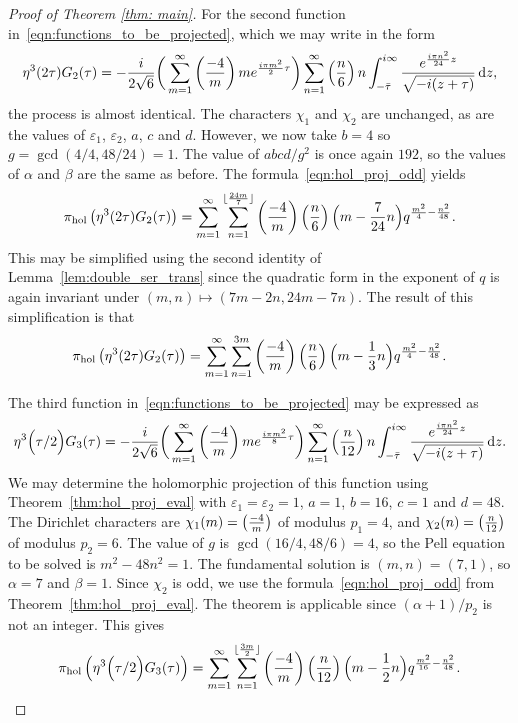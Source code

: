 \documentclass[11pt,reqno]{amsart}
\newcommand{\holoproj}[1]{\pi_{\mathrm{hol}}\left(#1\right)}
\renewcommand{\=}{\;=\;}
\theoremstyle{myremark}
\newcommand{\dd}{\mathrm{d}}
\begin{document}
\begin{proof}[Proof of Theorem \ref{thm: main}]
For the second function in~\eqref{eqn:functions_to_be_projected}, which we may write in the form
\[ \eta^3(2\tau) G_{2}(\tau) = -{i \over 2\sqrt{6}} \bigg( \sum_{m=1}^\infty \left({-4 \over m}\right) m e^{{i\pi m^2 \over 2}\tau} \bigg) \sum_{n=1}^\infty \left({n \over 6}\right) n \int_{-\bar{\tau}}^{i\infty} {e^{{i\pi n^2 \over 24}z} \over \sqrt{-i(z+\tau)}} \, \dd z, \]
the process is almost identical. The characters $\chi_1$ and $\chi_2$ are unchanged, as are the values of $\varepsilon_1$, $\varepsilon_2$, $a$, $c$ and $d$. However, we now take $b=4$ so $g=\gcd(4/4,48/24)=1$. The value of $abcd/g^2$ is once again $192$, so the values of $\alpha$ and $\beta$ are the same as before. The formula~\eqref{eqn:hol_proj_odd} yields
\[ 
\holoproj{\eta^3(2\tau) G_{2}(\tau)} = \sum_{m=1}^\infty \sum_{n=1}^{\lfloor {24m \over 7} \rfloor} \left({-4 \over m}\right) \left({n \over 6}\right) \Big(m - {7 \over 24}n \Big) q^{{m^2 \over 4} - {n^2 \over 48}}. 
\]
This may be simplified using the second identity of Lemma~\ref{lem:double_ser_trans} since the quadratic form in the exponent of $q$ is again invariant under $(m,n) \mapsto (7m-2n,24m-7n)$. The result of this simplification is that
\[ 
\holoproj{\eta^3(2\tau) G_{2}(\tau)} = \sum_{m=1}^\infty \sum_{n=1}^{3m} \left({-4 \over m}\right) \left({n \over 6}\right) \Big(m - {1 \over 3}n \Big) q^{{m^2 \over 4} - {n^2 \over 48}}. 
\]

The third function in~\eqref{eqn:functions_to_be_projected} may be expressed as
\[ 
\eta^3\Big({\tau / 2}\Big)G_{3}(\tau) = -{i \over 2\sqrt{6}} \bigg( \sum_{m=1}^\infty \left({-4 \over m}\right) m e^{{i\pi m^2 \over 8}\tau} \bigg) \sum_{n=1}^\infty \left({n \over 12}\right) n \int_{-\bar{\tau}}^{i\infty} {e^{{i\pi n^2 \over 24}z} \over \sqrt{-i(z+\tau)}} \, \dd z. 
\]
We may determine the holomorphic projection of this function using Theorem~\ref{thm:hol_proj_eval} with $\varepsilon_1=\varepsilon_2=1$, $a=1$, $b=16$, $c=1$ and $d=48$. The Dirichlet characters are $\chi_1(m)=\left({-4\over m}\right)$ of modulus $p_1=4$, and $\chi_2(n) = \left({n\over 12}\right)$ of modulus $p_2=6$. The value of $g$ is $\gcd(16/4,48/6)=4$, so the Pell equation to be solved is $m^2-48n^2=1$. The fundamental solution is $(m,n)=(7,1)$, so $\alpha=7$ and $\beta=1$. Since $\chi_2$ is odd, we use the formula~\eqref{eqn:hol_proj_odd} from Theorem~\ref{thm:hol_proj_eval}. The theorem is applicable since $(\alpha+1)/p_2$ is not an integer. This gives
\[ 
\holoproj{\eta^3\Big({\tau / 2}\Big)G_{3}(\tau)} = \sum_{m=1}^\infty \sum_{n=1}^{\lfloor {3m \over 2}\rfloor} \left({-4 \over m}\right) \left({n \over 12}\right) \Big( m-{1 \over 2}n \Big) q^{{m^2 \over 16}-{n^2 \over 48}}. \]


\end{proof}
\end{document}
